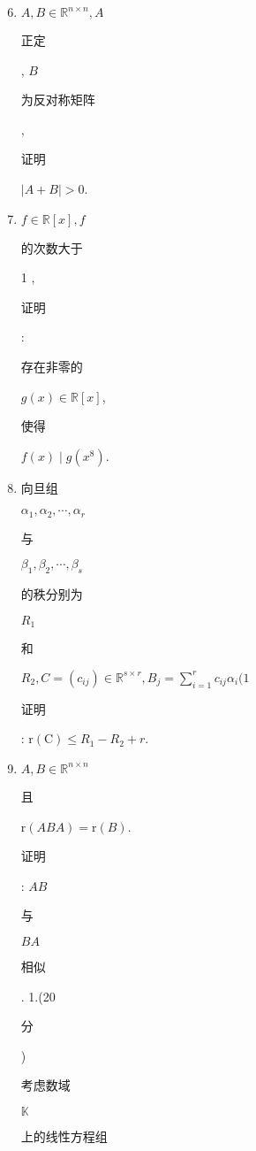 \documentclass[10pt]{article}
\begin{document}
\begin{enumerate}
  \setcounter{enumi}{5}
  \item $A, B \in \mathbb{R}^{n \times n}, A$ \begin{CJK}{UTF8}{mj}正定\end{CJK}, $B$ \begin{CJK}{UTF8}{mj}为反对称矩阵\end{CJK}, \begin{CJK}{UTF8}{mj}证明\end{CJK} $|A+B|>0$.

  \item $f \in \mathbb{R}[x], f$ \begin{CJK}{UTF8}{mj}的次数大于\end{CJK} 1 , \begin{CJK}{UTF8}{mj}证明\end{CJK}: \begin{CJK}{UTF8}{mj}存在非零的\end{CJK} $g(x) \in \mathbb{R}[x]$, \begin{CJK}{UTF8}{mj}使得\end{CJK} $f(x) \mid g\left(x^{8}\right)$.

  \item \begin{CJK}{UTF8}{mj}向旦组\end{CJK} $\alpha_{1}, \alpha_{2}, \cdots, \alpha_{r}$ \begin{CJK}{UTF8}{mj}与\end{CJK} $\beta_{1}, \beta_{2}, \cdots, \beta_{s}$ \begin{CJK}{UTF8}{mj}的秩分别为\end{CJK} $R_{1}$ \begin{CJK}{UTF8}{mj}和\end{CJK} $R_{2}, C=\left(c_{i j}\right) \in \mathbb{R}^{s \times r}, B_{j}=\sum_{i=1}^{r} c_{i j} \alpha_{i}(1$ \begin{CJK}{UTF8}{mj}证明\end{CJK}: $\mathrm{r}(\mathrm{C}) \leq R_{1}-R_{2}+r$.

  \item $A, B \in \mathbb{R}^{n \times n}$ \begin{CJK}{UTF8}{mj}且\end{CJK} $\mathrm{r}(A B A)=\mathrm{r}(B)$. \begin{CJK}{UTF8}{mj}证明\end{CJK}: $A B$ \begin{CJK}{UTF8}{mj}与\end{CJK} $B A$ \begin{CJK}{UTF8}{mj}相似\end{CJK}. 1.(20 \begin{CJK}{UTF8}{mj}分\end{CJK}) \begin{CJK}{UTF8}{mj}考虑数域\end{CJK} $\mathbb{K}$ \begin{CJK}{UTF8}{mj}上的线性方程组\end{CJK}

\end{enumerate}
\end{document}
